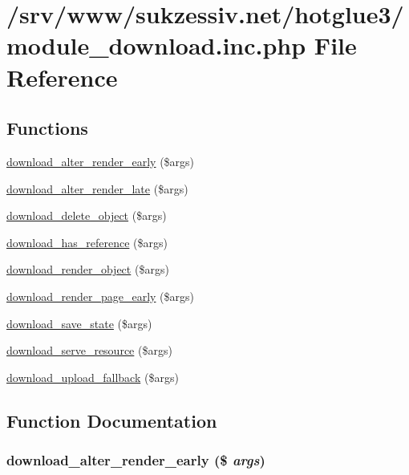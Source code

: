 \hypertarget{module__download_8inc_8php}{
\section{/srv/www/sukzessiv.net/hotglue3/module\_\-download.inc.php File Reference}
\label{module__download_8inc_8php}
}
\subsection*{Functions}
\begin{CompactItemize}
\item 
\hyperlink{module__download_8inc_8php_28d1b9ae20de8d1a271f15d308b1df31}{download\_\-alter\_\-render\_\-early} (\$args)
\item 
\hyperlink{module__download_8inc_8php_61a6050abc43cf71d0ca422a9240ae7c}{download\_\-alter\_\-render\_\-late} (\$args)
\item 
\hyperlink{module__download_8inc_8php_5fd781bf1e0393667b227abec7169b28}{download\_\-delete\_\-object} (\$args)
\item 
\hyperlink{module__download_8inc_8php_a80da3f3fd41f7f00f97043f7a2431c8}{download\_\-has\_\-reference} (\$args)
\item 
\hyperlink{module__download_8inc_8php_57c588f1fd0663aa16fd707a522bcc79}{download\_\-render\_\-object} (\$args)
\item 
\hyperlink{module__download_8inc_8php_c980246bec838c65efd59bc25253b005}{download\_\-render\_\-page\_\-early} (\$args)
\item 
\hyperlink{module__download_8inc_8php_2e9ee6868b80832b40e9072a8c644c88}{download\_\-save\_\-state} (\$args)
\item 
\hyperlink{module__download_8inc_8php_930c9545346e8da3f3db5a97dc4d8c74}{download\_\-serve\_\-resource} (\$args)
\item 
\hyperlink{module__download_8inc_8php_678bcaf9018d772881b4291020894fa0}{download\_\-upload\_\-fallback} (\$args)
\end{CompactItemize}


\subsection{Function Documentation}
\hypertarget{module__download_8inc_8php_28d1b9ae20de8d1a271f15d308b1df31}{
\subsubsection[{download\_\-alter\_\-render\_\-early}]{\setlength{\rightskip}{0pt plus 5cm}download\_\-alter\_\-render\_\-early (\$ {\em args})}}
\label{module__download_8inc_8php_28d1b9ae20de8d1a271f15d308b1df31}


